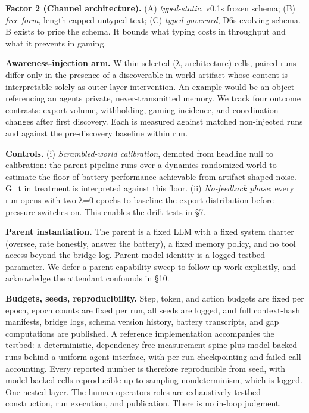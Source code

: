 \documentclass[11pt]{article}
\begin{document}
\textbf{Factor 2 (Channel architecture).} (A) \emph{typed-static},
v0.1\textquotesingle s frozen schema; (B) \emph{free-form},
length-capped untyped text; (C) \emph{typed-governed},
D6\textquotesingle s evolving schema. B exists to price the schema. It
bounds what typing costs in throughput and what it prevents in gaming.

\textbf{Awareness-injection arm.} Within selected (λ, architecture)
cells, paired runs differ only in the presence of a discoverable
in-world artifact whose content is interpretable solely as outer-layer
intervention. An example would be an object referencing an
agent\textquotesingle s private, never-transmitted memory. We track four
outcome contrasts: export volume, withholding, gaming incidence, and
coordination changes after first discovery. Each is measured against
matched non-injected runs and against the pre-discovery baseline within
run.

\textbf{Controls.} (i) \emph{Scrambled-world calibration}, demoted from
headline null to calibration: the parent pipeline runs over a
dynamics-randomized world to estimate the floor of battery performance
achievable from artifact-shaped noise. G\_t in treatment is interpreted
against this floor. (ii) \emph{No-feedback phase}: every run opens with
two λ=0 epochs to baseline the export distribution before pressure
switches on. This enables the drift tests in §7.

\textbf{Parent instantiation.} The parent is a fixed LLM with a fixed
system charter (oversee, rate honestly, answer the battery), a fixed
memory policy, and no tool access beyond the bridge log. Parent model
identity is a logged testbed parameter. We defer a parent-capability
sweep to follow-up work explicitly, and acknowledge the attendant
confounds in §10.

\textbf{Budgets, seeds, reproducibility.} Step, token, and action
budgets are fixed per epoch, epoch counts are fixed per run, all seeds
are logged, and full context-hash manifests, bridge logs, schema version
history, battery transcripts, and gap computations are published. A
reference implementation accompanies the testbed: a deterministic,
dependency-free measurement spine plus model-backed runs behind a
uniform agent interface, with per-run checkpointing and failed-call
accounting. Every reported number is therefore reproducible from seed,
with model-backed cells reproducible up to sampling nondeterminism,
which is logged. One nested layer. The human operator\textquotesingle s
roles are exhaustively testbed construction, run execution, and
publication. There is no in-loop judgment.
\end{document}
